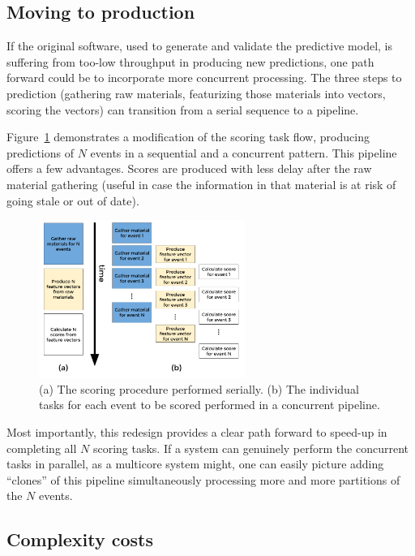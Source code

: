 \documentclass{article}
\begin{document}
\subsection{Moving to production}

 If the original software, used to generate and validate the predictive model,
is suffering from too-low throughput in producing new predictions, one path
forward could be to incorporate more concurrent processing. The three steps to
prediction (gathering raw materials, featurizing those materials into vectors,
scoring the vectors) can transition from a serial sequence to a pipeline.

  Figure~\ref{fig_pipeline} demonstrates a modification of the scoring task flow, producing
predictions of $N$ events in a sequential and a concurrent pattern.  This
pipeline offers a few advantages. Scores are produced with less delay after the
raw material gathering (useful in case the information in that material is at
risk of going stale or out of date).

\begin{figure}[h]
\includegraphics[width=0.6\textwidth]{fig/tex/pipeline.png}
\centering
\caption{(a) The scoring procedure performed serially. (b) The individual tasks
for each event to be scored performed in a concurrent pipeline.}
\label{fig_pipeline}
\end{figure}


 Most importantly, this redesign provides a clear path forward to speed-up in
completing all $N$ scoring tasks. If a system can genuinely perform the
concurrent tasks in parallel, as a multicore system might, one can easily
picture adding ``clones'' of this pipeline simultaneously processing more and
more partitions of the $N$ events.

\subsection{Complexity costs}
\end{document}
